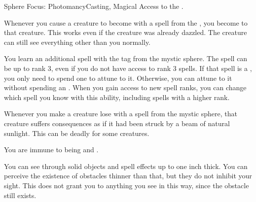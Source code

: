     \begin{magicalfeat}{Sphere Focus: Photomancy}{Casting, Magical}
        \featpre Access to the  .

         Whenever you cause a creature to become \dazzled with a spell from the  , you  become  to that creature.
        This works even if the creature was already dazzled.
        The creature can still see everything other than you normally.

         You learn an additional spell with the  tag from the  mystic sphere.
        The spell can be up to rank 3, even if you do not have access to rank 3 spells.
        If that spell is a , you only need to spend one  to attune to it.
        Otherwise, you can attune to it without spending an .
        When you gain access to new spell ranks, you can change which spell you know with this ability, including spells with a higher rank.

         Whenever you make a creature lose  with a spell from the  mystic sphere, that creature suffers consequences as if it had been struck by a beam of natural sunlight.
        This can be deadly for some creatures.

         You are immune to being \dazzled and \blinded.

         You can see through solid objects and spell effects up to one inch thick.
        You can perceive the existence of obstacles thinner than that, but they do not inhibit your sight.
        This does not grant you  to anything you see in this way, since the obstacle still exists.
    \end{magicalfeat}

